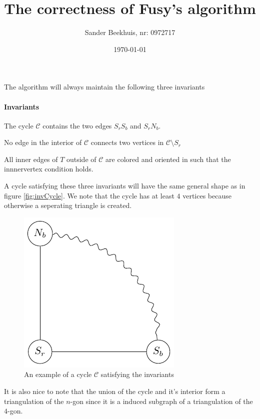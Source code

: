 \documentclass[a4paper]{article}
\title{The correctness of Fusy's algorithm}
\author{Sander Beekhuis, nr: 0972717}
\date{\today} %
\theoremstyle{definition}
\newcommand{\scr}[1]{\mathcal{#1}}
\newenvironment{invariants}{%
  \refstepcounter{thrm}%
  \paragraph{Invariants~\theprop}%
  \renewcommand*{\theenumi}{\theprop\,(I\arabic{enumi})}%
  \renewcommand*{\labelenumi}{(I\arabic{enumi})}%
  \enumerate
}{%
  \endenumerate
}
\begin{document}
\maketitle

\newcommand{\C}{\scr C}
\renewcommand{\P}{\scr{P}}


The algorithm will always maintain the following three invariants

\begin{invariants}
  \itemsep=-4pt

\item \label{i:1} The cycle $\C$ contains the two edges $S_rS_b$ and $S_rN_b$.
\item \label{i:2}No edge in the interior of $\C$ connects two vertices in $\C\setminus{S_r}$
\item \label{i:last} All inner edges of $T$ outside of $\C$ are colored and oriented in such that the innnervertex condition holds. %
\end{invariants}

A cycle satisfying these three invariants will have the same general shape as in figure \ref{fig:invCycle}. We note that the cycle has at least $4$ vertices because otherwise a seperating triangle is created. 

\begin{figure}[h!]
\centering
\includegraphics{img/algo/invCycle}

\caption{An example of a cycle $\C$ satisfying the invariants 
    \label{fig:invCycle }}
\end{figure}

It is also nice to note that the union of the cycle and it's interior form a triangulation of the $n$-gon since it is a induced subgraph of a triangulation of the $4$-gon.
\end{document}
